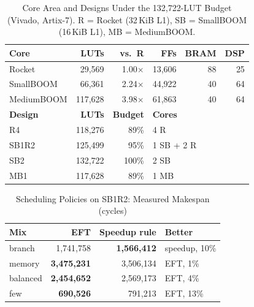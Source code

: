 
\begin{table}[t]
\centering
\caption{Core Area and Designs Under the 132,722-LUT Budget (Vivado, Artix-7). R = Rocket (32\,KiB L1), SB = SmallBOOM (16\,KiB L1), MB = MediumBOOM.}
\label{tab:area}
\footnotesize
\setlength{\tabcolsep}{3pt}
\begin{tabular}{lrrrrr}
\hline
\textbf{Core} & \textbf{LUTs} & \textbf{vs.\ R} & \textbf{FFs} & \textbf{BRAM} & \textbf{DSP} \\
\hline
Rocket     & 29,569  & 1.00$\times$ & 13,606 & 88 & 25 \\
SmallBOOM  & 66,361  & 2.24$\times$ & 44,922 & 40 & 64 \\
MediumBOOM & 117,628 & 3.98$\times$ & 61,863 & 40 & 64 \\
\hline
\textbf{Design} & \textbf{LUTs} & \textbf{Budget} & \multicolumn{3}{l}{\textbf{Cores}} \\
\hline
R4    & 118,276 & 89\%  & \multicolumn{3}{l}{4 R} \\
SB1R2 & 125,499 & 95\%  & \multicolumn{3}{l}{1 SB + 2 R} \\
SB2   & 132,722 & 100\% & \multicolumn{3}{l}{2 SB} \\
MB1   & 117,628 & 89\%  & \multicolumn{3}{l}{1 MB} \\
\hline
\end{tabular}
\end{table}

\begin{table}[t]
\centering
\caption{Scheduling Policies on SB1R2: Measured Makespan (cycles)}
\label{tab:policy}
\footnotesize
\begin{tabular}{lrrl}
\hline
\textbf{Mix} & \textbf{EFT} & \textbf{Speedup rule} & \textbf{Better} \\
\hline
branch   & 1,741,758 & \textbf{1,566,412} & speedup, 10\% \\
memory   & \textbf{3,475,231} & 3,506,134 & EFT, 1\% \\
balanced & \textbf{2,454,652} & 2,569,173 & EFT, 4\% \\
few      & \textbf{690,526}   & 791,213   & EFT, 13\% \\
\hline
\end{tabular}
\end{table}
